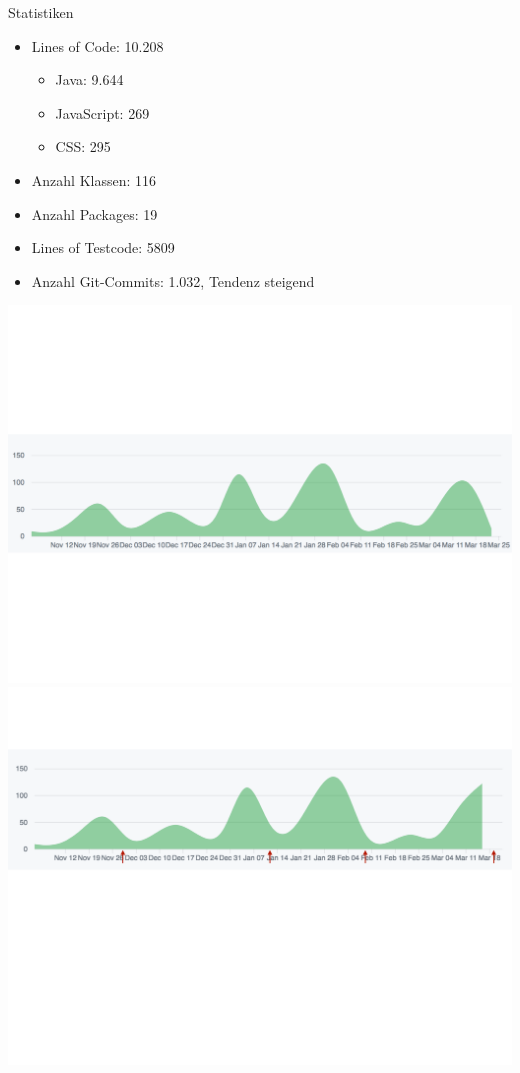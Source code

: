 \documentclass[10pt]{beamer}
\begin{document}
\begin{frame}{Statistiken}{}
	\begin{itemize}
		\item Lines of Code: 10.208
		\begin{itemize}
			\item Java: 9.644
			\item JavaScript: 269
			\item CSS: 295
		\end{itemize}
		\item Anzahl Klassen: 116
		\item Anzahl Packages: 19
		\item Lines of Testcode: 5809 
		\item Anzahl Git-Commits: 1.032, Tendenz steigend
	\end{itemize}
	
	\begin{overprint}
    \includegraphics[width = \textwidth]{img/GitCommits}
    \includegraphics[width = \textwidth]{img/GitCommitsWithApp}
    \end{overprint}
\end{frame}
\end{document}
